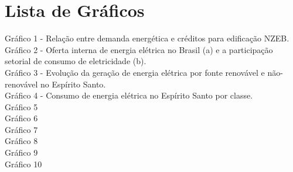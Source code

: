\section*{Lista de Gráficos}
\vspace*{1.5cm} %
\thispagestyle{empty}
    \begin{onehalfspace}
        Gráfico 1 - Relação entre demanda energética e créditos para edificação NZEB.\\
        Gráfico 2 - Oferta interna de energia elétrica no Brasil (a) e a 
        participação setorial de consumo de eletricidade (b).\\
        Gráfico 3 - Evolução da geração de energia elétrica por fonte renovável e não-renovável no Espírito Santo.\\
        Gráfico 4 - Consumo de energia elétrica no Espírito Santo por classe.\\
        Gráfico 5\\
        Gráfico 6\\
        Gráfico 7\\
        Gráfico 8\\
        Gráfico 9\\
        Gráfico 10\\
    \end{onehalfspace}